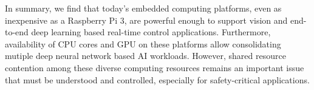 

In summary, we find that today's embedded computing platforms, even as
inexpensive as a Raspberry Pi 3, are powerful enough to support
vision and end-to-end deep learning based real-time control
applications. Furthermore, availability of CPU cores and GPU on these
platforms allow consolidating mutiple deep neural network based AI
workloads. However, shared resource contention among these diverse
computing resources remains an important issue that must be understood
and controlled, especially for safety-critical applications.
